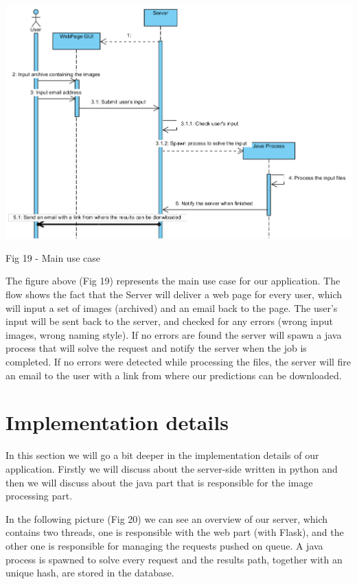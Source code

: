 \documentclass[12pt, a4paper]{report}
\begin{document}
\bigskip
\includegraphics[scale=0.7, center]{FlowCase.png}
\begin{center}
Fig 19 - Main use case
\end{center}
\par 

The figure above (Fig 19) represents the main use case for our application. The flow shows the fact that the Server will deliver a web page for every user, which will input a set of images (archived) and an email back to the page. The user's input will be sent back to the server, and checked for any errors (wrong input images, wrong naming style). If no errors are found the server will spawn a java process that will solve the request and notify the server when the job is completed. If no errors were detected while processing the files, the server will fire an email to the user with a link from where our predictions can be downloaded.


\section{Implementation details}
\quad
In this section we will go a bit deeper in the implementation details of our application. Firstly we will discuss about the server-side written in python and then we will discuss about the java part that is responsible for the image processing part.
\par 

In the following picture (Fig 20) we can see an overview of our server, which contains two threads, one is responsible with the web part (with Flask), and the other one is responsible for managing the requests pushed on queue. A java process is spawned to solve every request and the results path, together with an unique hash, are stored in the database.
\par 
\end{document}

